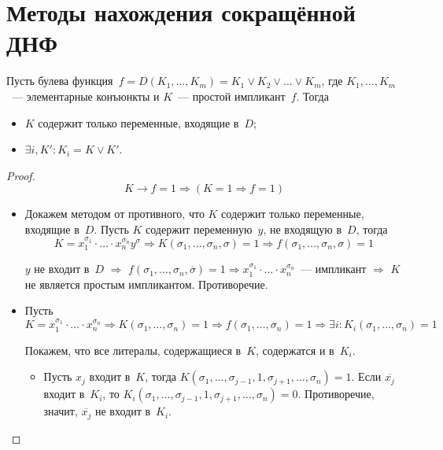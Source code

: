 \section{Методы нахождения сокращённой ДНФ}
\begin{statement}
\label{st:about_prime_implicants_1}
Пусть булева функция~$f = D(K_1, \ldots, K_m) = K_1 \lor K_2 \lor \ldots \lor K_m$, где $K_1, \ldots, K_m$~--- элементарные конъюнкты и $K$~--- простой импликант~$f$.
Тогда
\begin{itemize}
	\item $K$ содержит только переменные, входящие в~$D$;
	\item $\exists i, K' \colon K_i = K \lor K'$.
\end{itemize}
\end{statement}
\begin{proof}
\begin{equation*}
K \rightarrow f = 1 \Rightarrow (K = 1 \Rightarrow f = 1)
\end{equation*}
\begin{itemize}
	\item Докажем методом от противного, что $K$ содержит только переменные, входящие в~$D$.
	Пусть $K$ содержит переменную~$y$, не входящую в~$D$, тогда
	\begin{equation*}
	K = x_1^{\sigma_1} \cdot \ldots \cdot x_n^{\sigma_n} y^\sigma \Rightarrow
	K(\sigma_1, \ldots, \sigma_n, \sigma) = 1 \Rightarrow
	f(\sigma_1, \ldots, \sigma_n, \sigma) = 1
	\end{equation*}
	
	$y$ не входит в~$D$ $\Rightarrow$ $f(\sigma_1, \ldots, \sigma_n, \overline\sigma) = 1 \Rightarrow x_1^{\sigma_1} \cdot \ldots \cdot x_n^{\sigma_n}$~--- импликант $\Rightarrow$ $K$ не является простым импликантом.
	Противоречие.
	
	\item Пусть
	\begin{equation*}
	K = x_1^{\sigma_1} \cdot \ldots \cdot x_n^{\sigma_n} \Rightarrow
	K(\sigma_1, \ldots, \sigma_n) = 1 \Rightarrow
	f(\sigma_1, \ldots, \sigma_n) = 1 \Rightarrow
	\exists i \colon K_i(\sigma_1, \ldots, \sigma_n) = 1
	\end{equation*}
	
	Покажем, что все литералы, содержащиеся в~$K$, содержатся и в~$K_i$.
	\begin{itemize}
		\item Пусть $x_j$ входит в~$K$, тогда $K(\sigma_1, \ldots, \sigma_{j-1}, 1, \sigma_{j+1}, \ldots, \sigma_n) = 1$.
		Если $\overline{x_j}$ входит в~$K_i$, то $K_i(\sigma_1, \ldots, \allowbreak \sigma_{j-1}, 1, \sigma_{j+1}, \ldots, \sigma_n) = 0$.
		Противоречие, значит, $\overline{x_j}$ не входит в~$K_i$.
		

\end{itemize}
\end{itemize}
\end{proof}
